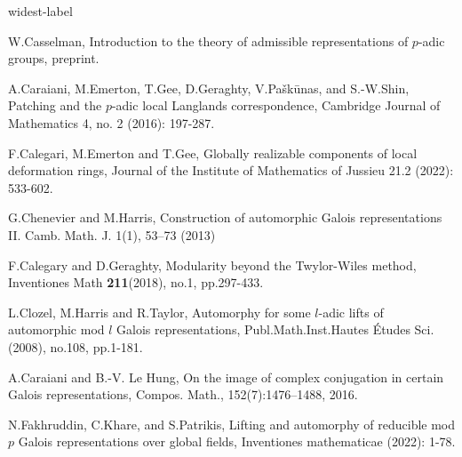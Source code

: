 \documentclass[12pt,oneside,reqno]{amsart}
\theoremstyle{plain}
\begin{document}
\begin{thebibliography}{widest-label}
		
		
		
		
		
		W.Casselman,
		Introduction to the theory of
		admissible representations of $p$-adic groups,
		preprint.
		
		
		
		
		
		
		A.Caraiani, M.Emerton, T.Gee, D.Geraghty, V.Paškūnas, and S.-W.Shin,
		Patching and the $p$-adic local Langlands correspondence,
		Cambridge Journal of Mathematics 4, no. 2 (2016): 197-287.
		
		
		F.Calegari, M.Emerton and T.Gee,
		Globally realizable components of local deformation rings,
		Journal of the Institute of Mathematics of Jussieu 21.2 (2022): 533-602.
		
		
		
		G.Chenevier and M.Harris,
		Construction of automorphic Galois representations II.
		Camb. Math. J. 1(1), 53–73 (2013)
		
		
		
		
		F.Calegary and D.Geraghty,
		Modularity beyond the Twylor-Wiles method,
		Inventiones Math
		\textbf{211}(2018),
		no.1,
		pp.297-433.
		
		
		L.Clozel, M.Harris and R.Taylor,
		Automorphy for some $l$-adic lifts
		of automorphic mod $l$ Galois representations,
		Publ.Math.Inst.Hautes \'{E}tudes Sci. (2008),
		no.108, pp.1-181.
		
		
		
		
		A.Caraiani and B.-V. Le Hung,
		On the image of complex conjugation in certain Galois representations,
		Compos. Math., 152(7):1476–1488, 2016.
		
		
		
		N.Fakhruddin, C.Khare, and S.Patrikis,
		Lifting and automorphy of reducible mod $p$ Galois representations over global fields,
		Inventiones mathematicae (2022): 1-78.
		
		
		
		
		
		

\end{thebibliography}
\end{document}
